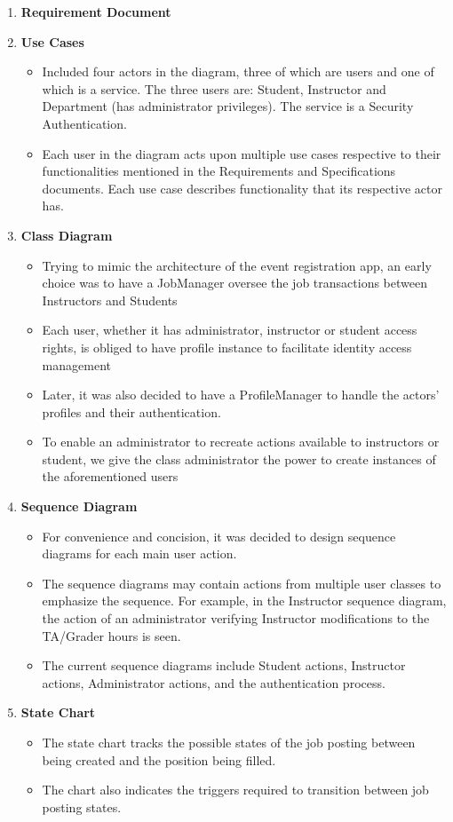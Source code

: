 \documentclass[12pt]{article}
\begin{document}

\begin{enumerate}
    \item \textbf{Requirement Document}
    \item \textbf{Use Cases}
    \begin{itemize}
    	\item Included four actors in the diagram, three of which are users and one of which is a service. The three users are: Student, Instructor and Department (has administrator privileges). The service is a Security Authentication.
    	\item Each user in the diagram acts upon multiple use cases respective to their functionalities mentioned in the Requirements and Specifications documents. Each use case describes functionality that its respective actor has.
    \end{itemize}
    \item \textbf{Class Diagram}
    \begin{itemize}
        \item Trying to mimic the architecture of the event registration app, an early choice was to have a JobManager oversee the job transactions between Instructors and Students
        \item Each user, whether it has administrator, instructor or student access rights, is obliged to have profile instance to facilitate identity access management
		\item Later, it was also decided to have a ProfileManager to handle the actors' profiles and
			their authentication.
        \item To enable an administrator to recreate actions available to instructors or student, we give the class administrator the power to create instances of the aforementioned users
    \end{itemize}
    \item \textbf{Sequence Diagram}
		\begin{itemize}
			\item For convenience and concision, it was decided to design sequence diagrams for each
				main user action.
			\item The sequence diagrams may contain actions from multiple user classes to emphasize
				the sequence. For example, in the Instructor sequence diagram, the action of an
				administrator verifying Instructor modifications to the TA/Grader hours is seen.
			\item The current sequence diagrams include Student actions, Instructor actions,
				Administrator actions, and the authentication process.
		\end{itemize}
    \item \textbf{State Chart}
        \begin{itemize}
            \item The state chart tracks the possible states of the job posting between being created and the position being filled.
            \item The chart also indicates the triggers required to transition between job posting states.


\end{itemize}
\end{enumerate}
\end{document}
